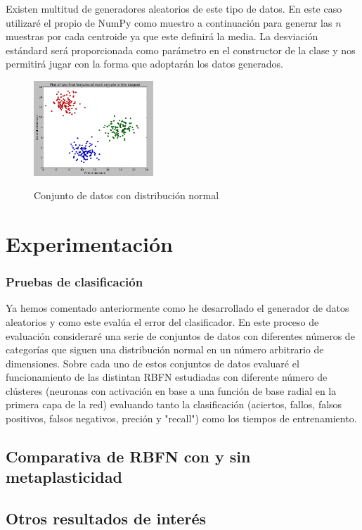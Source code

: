 \documentclass[10pt,a4paper]{report}
\begin{document}
Existen multitud de generadores aleatorios de este tipo de datos. En este caso utilizaré el propio de NumPy como muestro a continuación para generar las $n$ muestras por cada centroide ya que este definirá la media. La desviación estándard será proporcionada como parámetro en el constructor de la clase y nos permitirá jugar con la forma que adoptarán los datos generados.

\begin{figure}[!h]{}
    \centering
    \includegraphics[width=0.4\textwidth]{img/clusteredData1.png}
    \label{fig:clusteredData1}
    \caption{Conjunto de datos con distribución normal}
\end{figure}

\chapter{Experimentación}
\subsection{Pruebas de clasificación}
Ya hemos comentado anteriormente como he desarrollado el generador de datos aleatorios y como este evalúa el error del clasificador. En este proceso de evaluación consideraré una serie de conjuntos de datos con diferentes números de categorías que siguen una distribución normal en un número arbitrario de dimensiones. Sobre cada uno de estos conjuntos de datos evaluaré el funcionamiento de las distintan RBFN estudiadas con diferente número de clústeres (neuronas con activación en base a una función de base radial en la primera capa de la red) evaluando tanto la clasificación (aciertos, fallos, falsos positivos, falsos negativos, preción y "recall") como los tiempos de entrenamiento.

\section{Comparativa de RBFN con y sin metaplasticidad}
\section{Otros resultados de interés}



\end{document}
